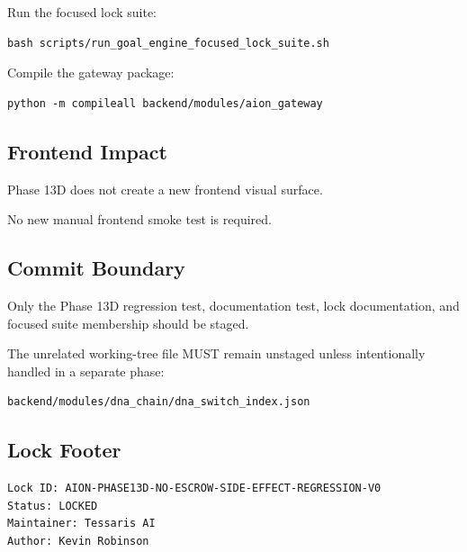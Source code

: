 Run the focused lock suite:

\begin{verbatim}
bash scripts/run_goal_engine_focused_lock_suite.sh
\end{verbatim}

Compile the gateway package:

\begin{verbatim}
python -m compileall backend/modules/aion_gateway
\end{verbatim}

\subsection{Frontend Impact}

Phase 13D does not create a new frontend visual surface.

No new manual frontend smoke test is required.

\subsection{Commit Boundary}

Only the Phase 13D regression test, documentation test, lock documentation, and focused suite membership should be staged.

The unrelated working-tree file MUST remain unstaged unless intentionally handled in a separate phase:

\begin{verbatim}
backend/modules/dna_chain/dna_switch_index.json
\end{verbatim}

\subsection{Lock Footer}

\begin{verbatim}
Lock ID: AION-PHASE13D-NO-ESCROW-SIDE-EFFECT-REGRESSION-V0
Status: LOCKED
Maintainer: Tessaris AI
Author: Kevin Robinson
\end{verbatim}
